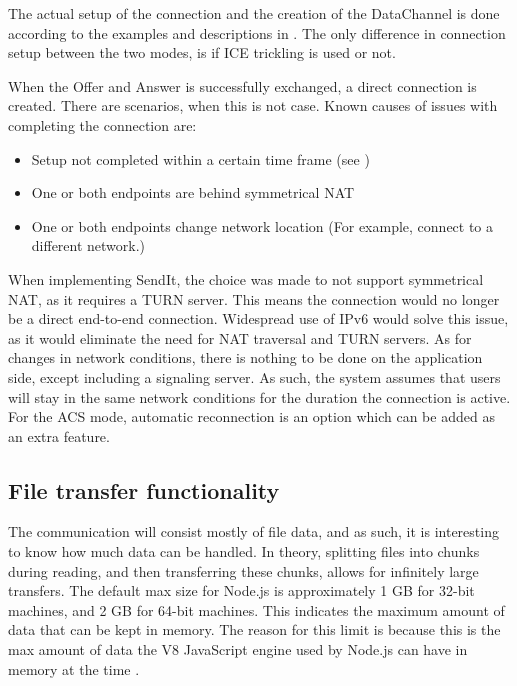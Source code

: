     The actual setup of the connection and the creation of the DataChannel is done according to the examples and descriptions in . The only difference in connection setup between the two modes, is if ICE trickling is used or not.

    When the Offer and Answer is successfully exchanged, a direct connection is created. There are scenarios, when this is not case. Known causes of issues with completing the connection are:
    \begin{itemize}
      \item Setup not completed within a certain time frame (see )
      \item One or both endpoints are behind symmetrical NAT
      \item One or both endpoints change network location (For example, connect to a different network.)
    \end{itemize}

    When implementing SendIt, the choice was made to not support symmetrical NAT, as it requires a TURN server. This means the connection would no longer be a direct end-to-end connection. 
    Widespread use of IPv6 would solve this issue, as it would eliminate the need for NAT traversal and TURN servers. As for changes in network conditions, there is nothing to be done on the application side, except including a signaling server. As such, the system assumes that users will stay in the same network conditions for the duration the connection is active. For the ACS mode, automatic reconnection is an option which can be added as an extra feature.
  
  \subsection{File transfer functionality}
    The communication will consist mostly of file data, and as such, it is interesting to know how much data can be handled. In theory, splitting files into chunks during reading, and then transferring these chunks, allows for infinitely large transfers. The default max size for Node.js is approximately 1 GB for 32-bit machines, and 2 GB for 64-bit machines. This indicates the maximum amount of data that can be kept in memory. The reason for this limit is because this is the max amount of data the V8 JavaScript engine used by Node.js can have in memory at the time \cite{url_node,url_v8}.


